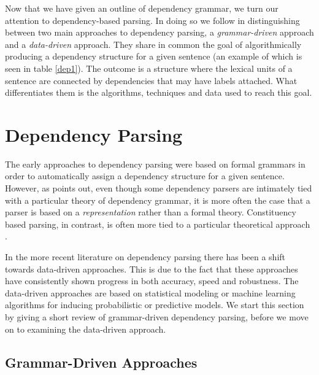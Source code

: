Now that we have given an outline of dependency grammar, we turn our attention to dependency-based parsing. In doing so we follow  in distinguishing between two main approaches to dependency parsing, a \textit{grammar-driven} approach and a \textit{data-driven} approach. They share in common the goal of algorithmically producing a dependency structure for a given sentence (an example of which is seen in table \ref{dep1}). The outcome is a structure where the lexical units of a sentence are connected by dependencies that may have labels attached. What differentiates them is the algorithms, techniques and data used to reach this goal.

\section{Dependency Parsing}
\label{parsing}

The early approaches to dependency parsing were based on formal grammars in order to automatically assign a dependency structure for a given sentence. However, as \citeauthor{Niv:05} points out, even though some dependency parsers are intimately tied with a particular theory of dependency grammar, it is more often the case that a parser is based on a \textit{representation} rather than a formal theory. Constituency based parsing, in contrast, is often more tied to a particular theoretical approach \cite{Niv:05}.


In the more recent literature on dependency parsing there has been a shift towards data-driven approaches. This is due to the fact that these approaches have consistently shown progress in both accuracy, speed and robustness. The data-driven approaches are based on statistical modeling or machine learning algorithms for inducing probabilistic or predictive models. We start this section by giving a short review of grammar-driven dependency parsing, before we move on to examining the data-driven approach.

\subsection{Grammar-Driven Approaches}
\label{grammar-driven}

